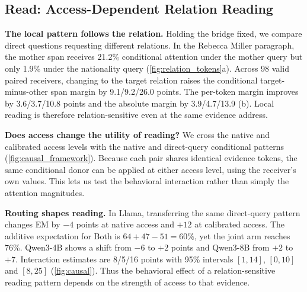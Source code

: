 \subsection{Read: Access-Dependent Relation Reading}\label{sec:causal_results}
\textbf{The local pattern follows the relation.} Holding the bridge fixed, we compare direct questions requesting different relations. In the Rebecca Miller paragraph, the mother span receives 21.2\% conditional attention under the mother query but only 1.9\% under the nationality query (\cref{fig:relation_tokens}a). Across 98 valid paired receivers, changing to the target relation raises the conditional target-minus-other span margin by 9.1/9.2/26.0 points. The per-token margin improves by 3.6/3.7/10.8 points and the absolute margin by 3.9/4.7/13.9 (b). Local reading is therefore relation-sensitive even at the same evidence address.

\textbf{Does access change the utility of reading?} We cross the native and calibrated access levels with the native and direct-query conditional patterns (\cref{fig:causal_framework}). Because each pair shares identical evidence tokens, the same conditional donor can be applied at either access level, using the receiver's own values. This lets us test the behavioral interaction rather than simply the attention magnitudes.

\textbf{Routing shapes reading.} In Llama, transferring the same direct-query pattern changes EM by $-4$ points at native access and $+12$ at calibrated access. The additive expectation for Both is $64+47-51=60\%$, yet the joint arm reaches 76\%. Qwen3-4B shows a shift from $-6$ to $+2$ points and Qwen3-8B from $+2$ to $+7$. Interaction estimates are 8/5/16 points with 95\% intervals $[1,14]$, $[0,10]$ and $[8,25]$ (\cref{fig:causal}). Thus the behavioral effect of a relation-sensitive reading pattern depends on the strength of access to that evidence.

